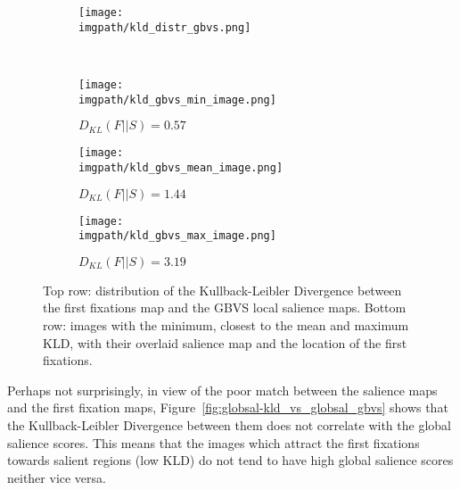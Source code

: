 {\begin{figure}[ht]
  \centering
  \begin{subfigure}{0.75 \linewidth}
      \texttt{[image: \\imgpath/kld\_distr\_gbvs.png]}
      \label{fig:globsal-kld_distr_gbvs_sub}
  \end{subfigure}
  \\
  \begin{subfigure}{0.3 \linewidth}
      \centering
      \texttt{[image: \\imgpath/kld\_gbvs\_min\_image.png]}
      \caption{$D_{KL}(F||S) = 0.57$}
    \label{fig:globsal-kld_gbvs_min_image}
  \end{subfigure}
  \hspace{0.02 \linewidth}
  \begin{subfigure}{0.3 \linewidth}
      \centering
      \texttt{[image: \\imgpath/kld\_gbvs\_mean\_image.png]}
      \caption{$D_{KL}(F||S) = 1.44$}
    \label{fig:globsal-kld_gbvs_mean_image}
  \end{subfigure}
  \hspace{0.02 \linewidth}
  \begin{subfigure}{0.3 \linewidth}
      \centering
      \texttt{[image: \\imgpath/kld\_gbvs\_max\_image.png]}
      \caption{$D_{KL}(F||S) = 3.19$}
    \label{fig:globsal-kld_gbvs_max_image}
  \end{subfigure}
  \caption{Top row: distribution of the Kullback-Leibler Divergence between the first fixations map and the GBVS local salience maps. Bottom row: images with the minimum, closest to the mean and maximum KLD, with their overlaid salience map and the location of the first fixations.}
\label{fig:globsal-kld_distr_gbvs}
\end{figure}

Perhaps not surprisingly, in view of the poor match between the salience maps and the first fixation maps, Figure~\ref{fig:globsal-kld_vs_globsal_gbvs} shows that the Kullback-Leibler Divergence between them does not correlate with the global salience scores. This means that the images which attract the first fixations towards salient regions (low KLD) do not tend to have high global salience scores neither vice versa.

}
